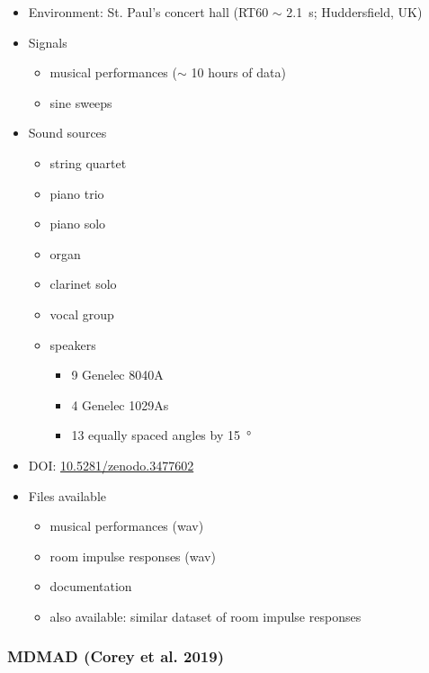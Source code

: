 \documentclass[14pt, legalpaper]{extarticle}
\begin{document}
\begin{itemize}
\item Environment: St. Paul's concert hall (RT60 $\sim$ \SI{2.1}{\second}; Huddersfield, UK)

\item Signals
	\begin{itemize}
	\item musical performances ($\sim$ 10 hours of data)
	\item sine sweeps
	\end{itemize}

\item Sound sources
	\begin{itemize}
	\item string quartet
	\item piano trio
	\item piano solo
	\item organ
	\item clarinet solo
	\item vocal group
	\item speakers
		\begin{itemize}
		\item 9 Genelec 8040A
		\item 4 Genelec 1029As
		\item 13 equally spaced angles by \SI{15}{\degree}
		\end{itemize}
	\end{itemize}

\item DOI: \href{https://zenodo.org/record/3477602}{10.5281/zenodo.3477602}

\item Files available
	\begin{itemize}
	\item musical performances (wav)
	\item room impulse responses (wav)
	\item documentation
	\item also available: similar dataset of room impulse responses \cite{lee2017microphone}
	\end{itemize}

\end{itemize}

\subsubsection{MDMAD (Corey et al. 2019)}
\end{document}
